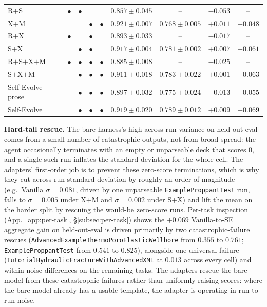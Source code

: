 \documentclass{article}
\begin{document}
\begin{table}[t]
{\begin{tabular}{l|cccc|cccc}
    R$+$S          & $\bullet$ & $\bullet$ &         &         & $0.857 \pm 0.045$           & --                           & $-0.053$          & --                \\
    X$+$M          &         &         & $\bullet$ & $\bullet$ & $\mathbf{0.921 \pm 0.007}$  & $0.768 \pm 0.005$            & $\mathbf{+0.011}$ & $+0.048$          \\
    R$+$X          & $\bullet$ &         & $\bullet$ &         & $0.893 \pm 0.033$           & --                           & $-0.017$          & --                \\
    S$+$X          &         & $\bullet$ & $\bullet$ &         & $0.917 \pm 0.004$           & $0.781 \pm \mathbf{0.002}$   & $+0.007$          & $+0.061$          \\
    R$+$S$+$X$+$M  & $\bullet$ & $\bullet$ & $\bullet$ & $\bullet$ & $0.885 \pm 0.008$           & --                           & $-0.025$          & --                \\
    \midrule
    S$+$X$+$M      &         & $\bullet$ & $\bullet$ & $\bullet$ & $0.911 \pm 0.018$           & $0.783 \pm 0.022$            & $+0.001$          & $+0.063$          \\
    Self-Evolve-prose &      & $\bullet$ & $\bullet$ & $\bullet$ & $0.897 \pm 0.032$           & $0.775 \pm 0.024$            & $-0.013$          & $+0.055$          \\
    Self-Evolve    &         & $\bullet$ & $\bullet$ & $\bullet$ & $0.919 \pm 0.020$           & $\mathbf{0.789 \pm 0.012}$   & $+0.009$          & $\mathbf{+0.069}$ \\
    \bottomrule
  \end{tabular}}
\end{table}

\textbf{Hard-tail rescue.} The bare harness's high across-run variance on held-out-eval comes from a small number of catastrophic outputs, not from broad spread: the agent occasionally terminates with an empty or unparseable deck that scores 0, and a single such run inflates the standard deviation for the whole cell. The adapters' first-order job is to prevent these zero-score terminations, which is why they cut across-run standard deviation by roughly an order of magnitude (e.g.\ Vanilla $\sigma = 0.081$, driven by one unparseable \texttt{ExampleProppantTest} run, falls to $\sigma = 0.005$ under X+M and $\sigma = 0.002$ under S+X) and lift the mean on the harder split by rescuing the would-be zero-score runs. Per-task inspection (App.~\ref{app:per-task}, \S\ref{subsec:per-task}) shows the $+0.069$ Vanilla-to-SE aggregate gain on held-out-eval is driven primarily by two catastrophic-failure rescues (\texttt{AdvancedExampleThermoPoroElasticWellbore} from $0.355$ to $0.761$; \texttt{ExampleProppantTest} from $0.541$ to $0.825$), alongside one universal failure (\texttt{TutorialHydraulicFractureWithAdvancedXML} at $0.013$ across every cell) and within-noise differences on the remaining tasks. The adapters rescue the bare model from these catastrophic failures rather than uniformly raising scores: where the bare model already has a usable template, the adapter is operating in run-to-run noise.
\end{document}
